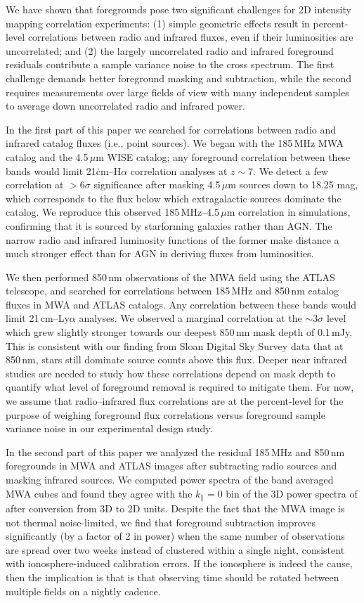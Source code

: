 \documentclass[numberedappendix]{emulateapj}
\begin{document}
We have shown that foregrounds pose two significant challenges for 2D intensity mapping correlation experiments: (1) simple geometric effects result in percent-level correlations between radio and infrared fluxes, even if their luminosities are uncorrelated; and (2) the largely uncorrelated radio and infrared foreground residuals contribute a sample variance noise to the cross spectrum. The first challenge demands better foreground masking and subtraction, while the second requires measurements over large fields of view with many independent samples to average down uncorrelated radio and infrared power.

In the first part of this paper we searched for correlations between radio and infrared catalog fluxes (i.e., point sources). We began with the 185\,MHz MWA catalog and the 4.5\,$\mu$m WISE catalog; any foreground correlation between these bands would limit 21\.cm--H$\alpha$ correlation analyses at $z\sim7$. We detect a few correlation at $>6\sigma$ significance after masking 4.5\,$\mu$m sources down to 18.25 mag, which corresponds to the flux below which extragalactic sources dominate the catalog. We reproduce this observed 185\,MHz--4.5\,$\mu$m correlation in simulations, confirming that it is sourced by starforming galaxies rather than AGN. The narrow radio and infrared luminosity functions of the former make distance a much stronger effect than for AGN in deriving fluxes from luminosities. 

We then performed 850\,nm observations of the MWA field using the ATLAS telescope, and searched for correlations between 185\,MHz and 850\,nm catalog fluxes in MWA and ATLAS catalogs. Any correlation between these bands would limit 21\,cm--Ly$\alpha$ analyses. We observed a marginal correlation at the $\sim3\sigma$ level which grew slightly stronger towards our deepest 850\,nm mask depth of 0.1\,mJy. This is consistent with our finding from Sloan Digital Sky Survey data that at 850\,nm, stars still dominate source counts above this flux. Deeper near infrared studies are needed to study how these correlations depend on mask depth to quantify what level of foreground removal is required to mitigate them. For now, we assume that radio--infrared flux correlations are at the percent-level for the purpose of weighing foreground flux correlations versus foreground sample variance noise in our experimental design study.

In the second part of this paper we analyzed the residual 185\,MHz and 850\,nm foregrounds in MWA and ATLAS images after subtracting radio sources and masking infrared sources. We computed power spectra of the band averaged MWA cubes and found they agree with the $k_\parallel=0$ bin of the 3D power spectra of \citet{beardsley16} after conversion from 3D to 2D units. Despite the fact that the MWA image is not thermal noise-limited, we find that foreground subtraction improves significantly (by a factor of 2 in power) when the same number of observations are spread over two weeks instead of clustered within a single night, consistent with ionosphere-induced calibration errors. If the ionosphere is indeed the cause, then the implication is that is that observing time should be rotated between multiple fields on a nightly cadence.
\end{document}
